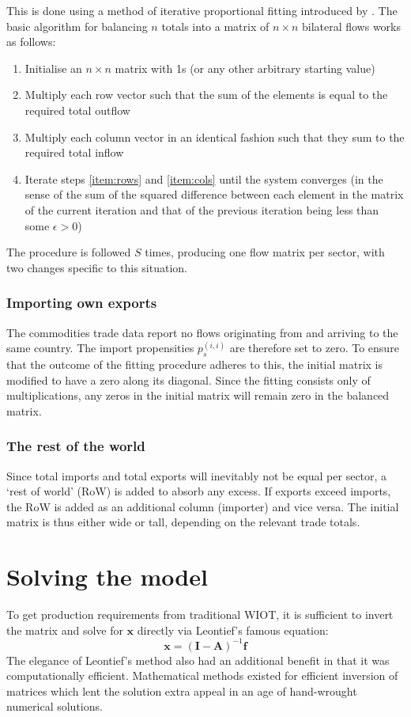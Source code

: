 \documentclass[a4paper]{article}
\begin{document}
This is done using a method of iterative proportional fitting introduced by \textcite{deming_least_1940}.
The basic algorithm for balancing $n$ totals into a matrix of $n \times n$ bilateral flows works as follows:
\begin{enumerate}
\itemsep -0.2em 
\item Initialise an $n \times n$ matrix with 1s (or any other arbitrary starting value)
\item Multiply each row vector such that the sum of the elements is equal to the required total outflow \label{item:rows}
\item Multiply each column vector in an identical fashion such that they sum to the required total inflow \label{item:cols}
\item Iterate steps \ref{item:rows} and \ref{item:cols} until the system converges (in the sense of the sum of the squared difference between each element in the matrix of the current iteration and that of the previous iteration being less than some $\epsilon > 0$)
\end{enumerate}
The procedure is followed $S$ times, producing one flow matrix per sector, with two changes specific to this situation.
\subsubsection*{Importing own exports}
The commodities trade data report no flows originating from and arriving to the same country.
The import propensities $p_s^{(i,i)}$ are therefore set to zero.
To ensure that the outcome of the fitting procedure adheres to this, the initial matrix is modified to have a zero along its diagonal.
Since the fitting consists only of multiplications, any zeros in the initial matrix will remain zero in the balanced matrix.

\subsubsection*{The rest of the world}
Since total imports and total exports will inevitably not be equal per sector, a `rest of world' (RoW) is added to absorb any excess.
If exports exceed imports, the RoW is added as an additional column (importer) and vice versa.
The initial matrix is thus either wide or tall, depending on the relevant trade totals.

\section{Solving the model}\label{sec:algorithm}
To get production requirements from traditional WIOT, it is sufficient to invert the matrix and solve for $\boldsymbol{x}$ directly via Leontief's famous equation:
\begin{equation}
\boldsymbol{x} = (\boldsymbol{I}- \boldsymbol{A})^{-1}\boldsymbol{f}
\end{equation}
The elegance of Leontief's method also had an additional benefit in that it was computationally efficient.
Mathematical methods existed for efficient inversion of matrices which lent the solution extra appeal in an age of hand-wrought numerical solutions.
\end{document}
